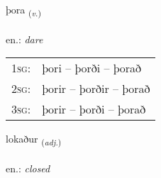 \documentclass[frontgrid, backgrid]{flacards}\usepackage[]{graphicx}\usepackage[]{xcolor}
\begin{document}
\renewcommand{\flhead}{\vskip5pt \fboxsep=0pt {\small\bfseries\footnotesize Sagnorð | Verb}}
\renewcommand{\fcfoot}{\vskip5pt \fboxsep=0pt \hspace{2pt}{\small\bfseries\footnotesize 2K}}

\renewcommand{\blhead}{\vskip5pt {\small\bfseries\footnotesize Sagnorð | Verb }}
\renewcommand{\bcfoot}{\vskip5pt \hspace{2pt}{\small\bfseries\footnotesize 2K}}


{þora \small{\textsubscript{(\textit{v.})}} \\[1ex] %
\textphonetic{[θɔːra]} \\
en.: \emph{dare} \\  [2ex]
\renewcommand*{\arraystretch}{0.8}
\begin{tabular}{p{1cm}l}
\textsc{1sg}: & þori -- þorði -- þorað \\ 
\textsc{2sg}: & þorir -- þorðir -- þorað \\ 
\textsc{3sg}: & þorir -- þorði -- þorað \\ 
\end{tabular}
}

\renewcommand{\flhead}{\vskip5pt \fboxsep=0pt {\small\bfseries\footnotesize Lýsingarorð | Adjective}}
\renewcommand{\fcfoot}{\vskip5pt \fboxsep=0pt \hspace{2pt}{\small\bfseries\footnotesize 2K}}

\renewcommand{\blhead}{\vskip5pt {\small\bfseries\footnotesize Lýsingarorð | Adjective }}
\renewcommand{\bcfoot}{\vskip5pt \hspace{2pt}{\small\bfseries\footnotesize 2K}}


{lokaður \small{\textsubscript{(\textit{adj.})}} \\[1ex] %
\textphonetic{[lɔːkaðʏr]} \\
en.: \emph{closed} \\  [2ex]
\renewcommand*{\arraystretch}{0.8}
}
\end{document}
